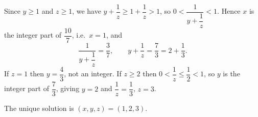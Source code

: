 Since $y\ge1$ and $z\ge1$, we have $y+\dfrac{1}{z}\ge1+\dfrac{1}{z}>1$, so $0<\dfrac{1}{y+\dfrac{1}{z}}<1$. Hence $x$ is the integer part of $\dfrac{10}{7}$, i.e.\ $x=1$, and
\[
\dfrac{1}{y+\dfrac{1}{z}}=\dfrac{3}{7},\qquad y+\dfrac{1}{z}=\dfrac{7}{3}=2+\dfrac{1}{3} .
\]
If $z=1$ then $y=\dfrac{4}{3}$, not an integer. If $z\ge2$ then $0<\dfrac{1}{z}\le\dfrac{1}{2}<1$, so $y$ is the integer part of $\dfrac{7}{3}$, giving $y=2$ and $\dfrac{1}{z}=\dfrac{1}{3}$, $z=3$.

The unique solution is $\boxed{(x,y,z)=(1,2,3)}$.
